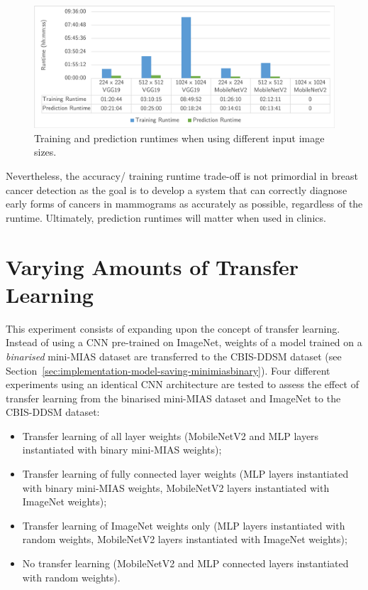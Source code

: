 \begin{figure}[H]
\centerline{\includegraphics[width=\textwidth]{figures/evaluation/image_size_experiment/runtimes.png}}
\caption{\label{fig:evaluation-image_size_experiment-runtimes}Training and prediction runtimes when using different input image sizes.}
\end{figure}

Nevertheless, the accuracy/ training runtime trade-off is not primordial in breast cancer detection as the goal is to develop a system that can correctly diagnose early forms of cancers in mammograms as accurately as possible, regardless of the runtime. Ultimately, prediction runtimes will matter when used in clinics.


\section{Varying Amounts of Transfer Learning}
\label{sec:evaluation-transfer-learning}

This experiment consists of expanding upon the concept of transfer learning. Instead of using a CNN pre-trained on ImageNet, weights of a model trained on a \textit{binarised} mini-MIAS dataset are transferred to the CBIS-DDSM dataset (see Section~\ref{sec:implementation-model-saving-minimiasbinary}). Four different experiments using an identical CNN architecture are tested to assess the effect of transfer learning from the binarised mini-MIAS dataset and ImageNet to the CBIS-DDSM dataset:
\begin{itemize}
    \item Transfer learning of all layer weights (MobileNetV2 and MLP layers instantiated with binary mini-MIAS weights);
    \item Transfer learning of fully connected layer weights (MLP layers instantiated with binary mini-MIAS weights, MobileNetV2 layers instantiated with ImageNet weights);
    \item Transfer learning of ImageNet weights only (MLP layers instantiated with random weights, MobileNetV2 layers instantiated with ImageNet weights);
    \item No transfer learning (MobileNetV2 and MLP connected layers instantiated with random weights).
\end{itemize}


